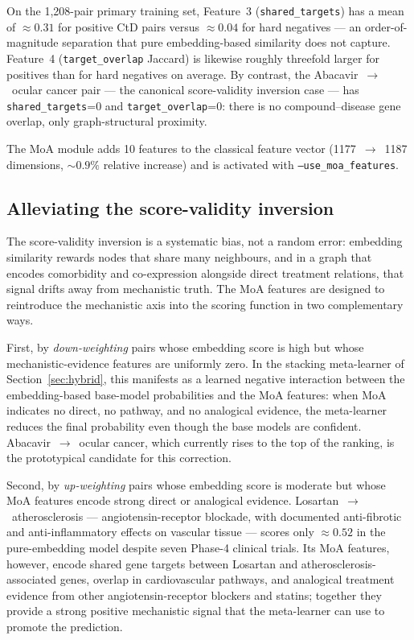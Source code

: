 \documentclass[twocolumn,10pt]{article}
\begin{document}
On the 1{,}208-pair primary training set, Feature~3 (\texttt{shared\_targets}) has a mean of $\approx 0.31$ for positive CtD pairs versus $\approx 0.04$ for hard negatives --- an order-of-magnitude separation that pure embedding-based similarity does not capture. Feature~4 (\texttt{target\_overlap} Jaccard) is likewise roughly threefold larger for positives than for hard negatives on average. By contrast, the Abacavir~$\to$~ocular cancer pair --- the canonical score-validity inversion case --- has \texttt{shared\_targets}=0 and \texttt{target\_overlap}=0: there is no compound--disease gene overlap, only graph-structural proximity.

The MoA module adds 10 features to the classical feature vector (1177~$\to$~1187 dimensions, ${\sim}0.9\%$ relative increase) and is activated with \texttt{--use\_moa\_features}.

\subsection{Alleviating the score-validity inversion}

The score-validity inversion is a systematic bias, not a random error: embedding similarity rewards nodes that share many neighbours, and in a graph that encodes comorbidity and co-expression alongside direct treatment relations, that signal drifts away from mechanistic truth. The MoA features are designed to reintroduce the mechanistic axis into the scoring function in two complementary ways.

First, by \emph{down-weighting} pairs whose embedding score is high but whose mechanistic-evidence features are uniformly zero. In the stacking meta-learner of Section~\ref{sec:hybrid}, this manifests as a learned negative interaction between the embedding-based base-model probabilities and the MoA features: when MoA indicates no direct, no pathway, and no analogical evidence, the meta-learner reduces the final probability even though the base models are confident. Abacavir~$\to$~ocular cancer, which currently rises to the top of the ranking, is the prototypical candidate for this correction.

Second, by \emph{up-weighting} pairs whose embedding score is moderate but whose MoA features encode strong direct or analogical evidence. Losartan~$\to$~atherosclerosis --- angiotensin-receptor blockade, with documented anti-fibrotic and anti-inflammatory effects on vascular tissue --- scores only $\approx 0.52$ in the pure-embedding model despite seven Phase-4 clinical trials. Its MoA features, however, encode shared gene targets between Losartan and atherosclerosis-associated genes, overlap in cardiovascular pathways, and analogical treatment evidence from other angiotensin-receptor blockers and statins; together they provide a strong positive mechanistic signal that the meta-learner can use to promote the prediction.
\end{document}
